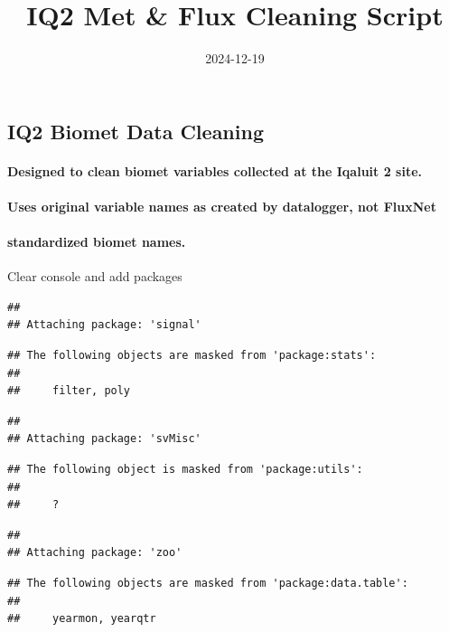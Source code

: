 \documentclass[
]{article}
\title{IQ2 Met \& Flux Cleaning Script}
\author{}
\date{\vspace{-2.5em}2024-12-19}
\begin{document}
\maketitle

\subsection{IQ2 Biomet Data Cleaning}\label{iq2-biomet-data-cleaning}

\paragraph{Designed to clean biomet variables collected at the Iqaluit 2
site.}\label{designed-to-clean-biomet-variables-collected-at-the-iqaluit-2-site.}

\paragraph{Uses original variable names as created by datalogger, not
FluxNet}\label{uses-original-variable-names-as-created-by-datalogger-not-fluxnet}

\paragraph{standardized biomet names.}\label{standardized-biomet-names.}

Clear console and add packages

\begin{verbatim}
## 
## Attaching package: 'signal'
\end{verbatim}

\begin{verbatim}
## The following objects are masked from 'package:stats':
## 
##     filter, poly
\end{verbatim}

\begin{verbatim}
## 
## Attaching package: 'svMisc'
\end{verbatim}

\begin{verbatim}
## The following object is masked from 'package:utils':
## 
##     ?
\end{verbatim}

\begin{verbatim}
## 
## Attaching package: 'zoo'
\end{verbatim}

\begin{verbatim}
## The following objects are masked from 'package:data.table':
## 
##     yearmon, yearqtr
\end{verbatim}
\end{document}
